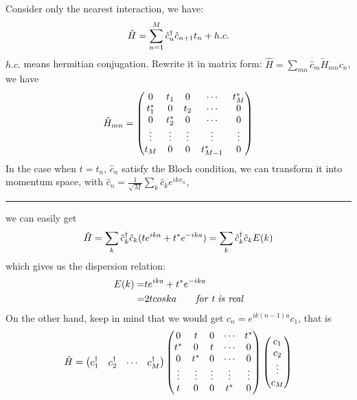 \documentclass[letterpaper,10pt,english]{sphinxmanual}
\begin{document}
Consider only the nearest interaction, we have:
\begin{gather}
\begin{split}\hat{H}=\sum_{n=1}^M \hat{c}_n^\dagger \hat{c}_{n+1}t_n+h.c.\end{split}\notag
\end{gather}
\(h.c.\) means hermitian conjugation. Rewrite it in matrix form:
\(\hat{H}=\sum\limits_{mn}\hat{c}_m \tilde{H}_{mn}c_n\), we have
\begin{gather}
\begin{split}\tilde{H}_{mn}=\begin{pmatrix} 0 & t_1 &0 & \cdots&t_M^*\\
t_1^* &0&t_2&\cdots&0\\
0&t_2^*&0&\cdots&0\\
\vdots&\vdots&\vdots&\vdots&\vdots\\
t_M&0&0&t_{M-1}^*&0
\end{pmatrix}\end{split}\notag
\end{gather}
In the case when \(t=t_n\), \(\hat{c}_n\) satisfy the Bloch
condition, we can transform it into momentum space, with
\(\hat{c}_n=\frac{1}{\sqrt{M}}\sum\limits_k \hat{c}_k e^{ikx_n}\),


\bigskip\hrule{}\bigskip


we can easily get
\begin{gather}
\begin{split}\hat{H}=\sum\limits_k \hat{c}_k^\dagger \hat{c}_k(te^{ika}+t^*e^{-ika})=\sum\limits_k \hat{c}_k^\dagger \hat{c}_k E(k)\end{split}\notag
\end{gather}
which gives us the dispersion relation:
\begin{gather}
\begin{split}E(k)=&te^{ika}+t^*e^{-ika}\\
=&2tcoska \qquad \textit{for t is real}\end{split}\notag
\end{gather}
On the other hand, keep in mind that we would get
\(c_n=e^{ik(n-1)a}c_1\), that is
\begin{gather}
\begin{split}\hat{H}=\begin{pmatrix}c_1^\dagger&c_2^\dagger&\cdots&c_M^\dagger \end{pmatrix}
\begin{pmatrix} 0 & t &0 & \cdots&t^*\\
t^* &0&t&\cdots&0\\
0&t^*&0&\cdots&0\\
\vdots&\vdots&\vdots&\vdots&\vdots\\
t&0&0&t^*&0
\end{pmatrix}
\begin{pmatrix}c_1\\c_2\\\vdots\\c_M\end{pmatrix}\end{split}\notag
\end{gather}
\end{document}

